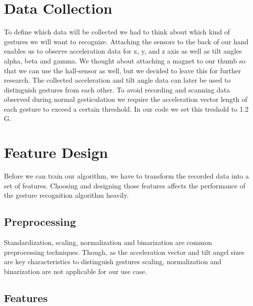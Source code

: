 \section{Data Collection}
\label{ch:DataCollection:sec:DataCollection}

To  define  which  data  will  be  collected  we  had  to  think  about  which  kind  of gestures  we  will  want  to  recognize.
Attaching  the  sensors  to  the  back  of  our  hand enables us to observe acceleration data  for x,  y, and z axis  as well  as tilt  angles  alpha, beta and gamma.
We thought about attaching a magnet to our thumb so that we can use the hall-sensor as well,  but we decided to leave this  for  further research.
The collected acceleration and tilt angle data can later be used to distinguish gestures from each other.
To avoid recording and scanning data observed during normal gesticulation we require the acceleration vector length of each gesture to exceed a certain threshold.
In our code we set this treshold to 1.2 G.

\section{Feature Design}
\label{ch:DataCollection:sec:FeatureDesign}

Before we can train our algorithm, we  have to transform the recorded data into a set  of  features.
Choosing  and  designing  those  features  affects  the  performance  of  the gesture recognition algorithm heavily.

\subsection{Preprocessing}
\label{ch:DataCollection:sec:FeatureDesign:sub:Preprocessing}

Standardization,     scaling,     normalization     and     binarization     are     common preprocessing techniques.
Though, as the acceleration vector and tilt angel sizes are key characteristics  to  distinguish  gestures  scaling,  normalization  and  binarization  are  not applicable for our use case. 

\subsection{Features}
\label{ch:DataCollection:sec:FeatureDesign:sub:Features}


